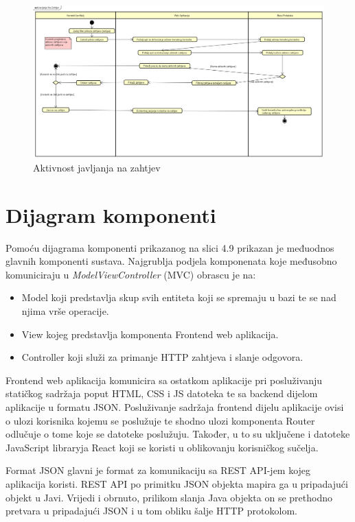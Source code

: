 			
			\begin{figure}[H]
				\includegraphics[scale=0.5]{slike/dijagram_aktivnosti.png} %
				\centering
				\caption{Aktivnost javljanja na zahtjev}
				
			\end{figure}
			
			\eject
		\section{Dijagram komponenti}
		
			Pomoću dijagrama komponenti prikazanog na slici 4.9 prikazan je međuodnos glavnih komponenti sustava.
			Najgrublja podjela komponenata koje međusobno komuniciraju u \textit{ModelViewController} (MVC) obrascu je na:
			\begin{itemize}
				\item Model koji predstavlja skup svih entiteta koji se spremaju u bazi te se nad njima vrše operacije.
				\item View kojeg predstavlja komponenta Frontend web aplikacija.
				\item Controller koji služi za primanje HTTP zahtjeva i slanje odgovora.
			\end{itemize}
			
			Frontend web aplikacija komunicira sa ostatkom aplikacije pri posluživanju statičkog sadržaja poput HTML, CSS i JS datoteka te sa backend dijelom aplikacije u formatu JSON.
			Posluživanje sadržaja frontend dijelu aplikacije ovisi o ulozi korisnika kojemu se poslužuje te
			shodno ulozi komponenta Router odlučuje o tome koje se datoteke poslužuju. Također, u to su uključene i datoteke JavaScript libraryja React koji se koristi u oblikovanju korisničkog sučelja.
			
			Format JSON glavni je format za komunikaciju sa REST API-jem kojeg aplikacija koristi.
			REST API po primitku JSON objekta mapira ga u pripadajući objekt u Javi. Vrijedi i obrnuto, prilikom slanja Java objekta on se prethodno pretvara u pripadajući JSON i u tom obliku šalje HTTP protokolom.
			

